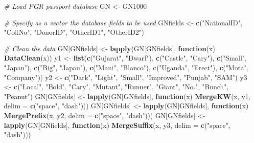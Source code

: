 \documentclass[
]{article}
\newenvironment{Shaded}{\begin{snugshade}}{\end{snugshade}}
\newcommand{\CommentTok}[1]{\textcolor[rgb]{0.56,0.35,0.01}{\textit{#1}}}
\newcommand{\ControlFlowTok}[1]{\textcolor[rgb]{0.13,0.29,0.53}{\textbf{#1}}}
\newcommand{\DataTypeTok}[1]{\textcolor[rgb]{0.13,0.29,0.53}{#1}}
\newcommand{\KeywordTok}[1]{\textcolor[rgb]{0.13,0.29,0.53}{\textbf{#1}}}
\newcommand{\NormalTok}[1]{#1}
\newcommand{\StringTok}[1]{\textcolor[rgb]{0.31,0.60,0.02}{#1}}
\begin{document}
\begin{Shaded}
\begin{Highlighting}[]
\CommentTok{# Load PGR passport database}
\NormalTok{GN <-}\StringTok{ }\NormalTok{GN1000}

\CommentTok{# Specify as a vector the database fields to be used}
\NormalTok{GNfields <-}\StringTok{ }\KeywordTok{c}\NormalTok{(}\StringTok{"NationalID"}\NormalTok{, }\StringTok{"CollNo"}\NormalTok{, }\StringTok{"DonorID"}\NormalTok{, }\StringTok{"OtherID1"}\NormalTok{, }\StringTok{"OtherID2"}\NormalTok{)}

\CommentTok{# Clean the data}
\NormalTok{GN[GNfields] <-}\StringTok{ }\KeywordTok{lapply}\NormalTok{(GN[GNfields], }\ControlFlowTok{function}\NormalTok{(x) }\KeywordTok{DataClean}\NormalTok{(x))}
\NormalTok{y1 <-}\StringTok{ }\KeywordTok{list}\NormalTok{(}\KeywordTok{c}\NormalTok{(}\StringTok{"Gujarat"}\NormalTok{, }\StringTok{"Dwarf"}\NormalTok{), }\KeywordTok{c}\NormalTok{(}\StringTok{"Castle"}\NormalTok{, }\StringTok{"Cary"}\NormalTok{), }\KeywordTok{c}\NormalTok{(}\StringTok{"Small"}\NormalTok{, }\StringTok{"Japan"}\NormalTok{),}
\KeywordTok{c}\NormalTok{(}\StringTok{"Big"}\NormalTok{, }\StringTok{"Japan"}\NormalTok{), }\KeywordTok{c}\NormalTok{(}\StringTok{"Mani"}\NormalTok{, }\StringTok{"Blanco"}\NormalTok{), }\KeywordTok{c}\NormalTok{(}\StringTok{"Uganda"}\NormalTok{, }\StringTok{"Erect"}\NormalTok{),}
\KeywordTok{c}\NormalTok{(}\StringTok{"Mota"}\NormalTok{, }\StringTok{"Company"}\NormalTok{))}
\NormalTok{y2 <-}\StringTok{ }\KeywordTok{c}\NormalTok{(}\StringTok{"Dark"}\NormalTok{, }\StringTok{"Light"}\NormalTok{, }\StringTok{"Small"}\NormalTok{, }\StringTok{"Improved"}\NormalTok{, }\StringTok{"Punjab"}\NormalTok{, }\StringTok{"SAM"}\NormalTok{)}
\NormalTok{y3 <-}\StringTok{ }\KeywordTok{c}\NormalTok{(}\StringTok{"Local"}\NormalTok{, }\StringTok{"Bold"}\NormalTok{, }\StringTok{"Cary"}\NormalTok{, }\StringTok{"Mutant"}\NormalTok{, }\StringTok{"Runner"}\NormalTok{, }\StringTok{"Giant"}\NormalTok{, }\StringTok{"No."}\NormalTok{,}
        \StringTok{"Bunch"}\NormalTok{, }\StringTok{"Peanut"}\NormalTok{)}
\NormalTok{GN[GNfields] <-}\StringTok{ }\KeywordTok{lapply}\NormalTok{(GN[GNfields],}
                       \ControlFlowTok{function}\NormalTok{(x) }\KeywordTok{MergeKW}\NormalTok{(x, y1, }\DataTypeTok{delim =} \KeywordTok{c}\NormalTok{(}\StringTok{"space"}\NormalTok{, }\StringTok{"dash"}\NormalTok{)))}
\NormalTok{GN[GNfields] <-}\StringTok{ }\KeywordTok{lapply}\NormalTok{(GN[GNfields],}
                       \ControlFlowTok{function}\NormalTok{(x) }\KeywordTok{MergePrefix}\NormalTok{(x, y2, }\DataTypeTok{delim =} \KeywordTok{c}\NormalTok{(}\StringTok{"space"}\NormalTok{, }\StringTok{"dash"}\NormalTok{)))}
\NormalTok{GN[GNfields] <-}\StringTok{ }\KeywordTok{lapply}\NormalTok{(GN[GNfields],}
                       \ControlFlowTok{function}\NormalTok{(x) }\KeywordTok{MergeSuffix}\NormalTok{(x, y3, }\DataTypeTok{delim =} \KeywordTok{c}\NormalTok{(}\StringTok{"space"}\NormalTok{, }\StringTok{"dash"}\NormalTok{)))}


\end{Highlighting}
\end{Shaded}
\end{document}
